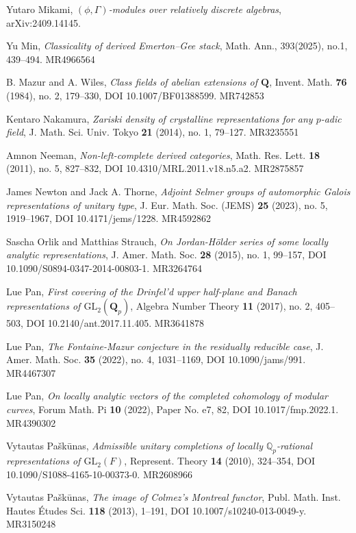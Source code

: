 \item[{[Mik24]}] Yutaro Mikami, \emph{$(\phi,\Gamma)$-modules over relatively discrete algebras}, arXiv:2409.14145.
\item[{[Min24]}] Yu Min, \emph{Classicality of derived Emerton--Gee stack}, Math. Ann., 393(2025), no.1, 439--494. MR4966564
\item[{[MW84]}] B. Mazur and A. Wiles, \emph{Class fields of abelian extensions of $\mathbf{Q}$}, Invent. Math. \textbf{76} (1984), no. 2, 179--330, DOI 10.1007/BF01388599. MR742853
\item[{[Nak14]}] Kentaro Nakamura, \emph{Zariski density of crystalline representations for any $p$-adic field}, J. Math. Sci. Univ. Tokyo \textbf{21} (2014), no. 1, 79--127. MR3235551
\item[{[Nee11]}] Amnon Neeman, \emph{Non-left-complete derived categories}, Math. Res. Lett. \textbf{18} (2011), no. 5, 827--832, DOI 10.4310/MRL.2011.v18.n5.a2. MR2875857
\item[{[NT23]}] James Newton and Jack A. Thorne, \emph{Adjoint Selmer groups of automorphic Galois representations of unitary type}, J. Eur. Math. Soc. (JEMS) \textbf{25} (2023), no. 5, 1919--1967, DOI 10.4171/jems/1228. MR4592862
\item[{[OS15]}] Sascha Orlik and Matthias Strauch, \emph{On Jordan-H\"older series of some locally analytic representations}, J. Amer. Math. Soc. \textbf{28} (2015), no. 1, 99--157, DOI 10.1090/S0894-0347-2014-00803-1. MR3264764
\item[{[Pan17]}] Lue Pan, \emph{First covering of the Drinfel'd upper half-plane and Banach representations of $\mathrm{GL}_2(\mathbf{Q}_p)$}, Algebra Number Theory \textbf{11} (2017), no. 2, 405--503, DOI 10.2140/ant.2017.11.405. MR3641878
\item[{[Pan22a]}] Lue Pan, \emph{The Fontaine-Mazur conjecture in the residually reducible case}, J. Amer. Math. Soc. \textbf{35} (2022), no. 4, 1031--1169, DOI 10.1090/jams/991. MR4467307
\item[{[Pan22b]}] Lue Pan, \emph{On locally analytic vectors of the completed cohomology of modular curves}, Forum Math. Pi \textbf{10} (2022), Paper No. e7, 82, DOI 10.1017/fmp.2022.1. MR4390302
\item[{[Pa\v{s}10]}] Vytautas Pa\v{s}k\={u}nas, \emph{Admissible unitary completions of locally $\mathbb{Q}_p$-rational representations of $\mathrm{GL}_2(F)$}, Represent. Theory \textbf{14} (2010), 324--354, DOI 10.1090/S1088-4165-10-00373-0. MR2608966
\item[{[Pa\v{s}13]}] Vytautas Pa\v{s}k\={u}nas, \emph{The image of Colmez's Montreal functor}, Publ. Math. Inst. Hautes \'Etudes Sci. \textbf{118} (2013), 1--191, DOI 10.1007/s10240-013-0049-y. MR3150248
